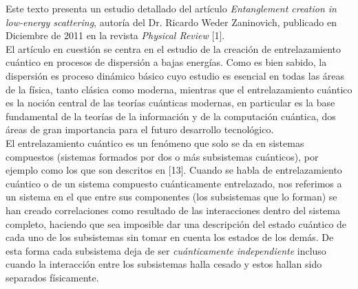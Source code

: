 \documentclass[12pt]{book}
\numberwithin{equation}{chapter}
\begin{document}

$$ $$
\newpage
Este texto presenta un estudio detallado del art\'iculo \emph{Entanglement creation in low-energy scattering}, autor\'ia del Dr. Ricardo Weder Zaninovich, publicado en Diciembre de 2011 en la revista \emph{Physical Review} [1].\\

El art\'iculo en cuesti\'on se centra en el estudio de la creaci\'on de entrelazamiento cu\'antico en procesos de dispersi\'on a bajas energ\'ias. Como es bien sabido, la dispersi\'on  es proceso din\'amico b\'asico cuyo estudio es esencial en todas las \'areas de la f\'isica, tanto cl\'asica como moderna, mientras que el entrelazamiento cu\'antico es la noci\'on central de las teor\'ias cu\'anticas modernas, en particular es la base fundamental de la teor\'ias de la informaci\'on y de la computaci\'on cu\'antica, dos \'areas de gran importancia para el futuro desarrollo tecnol\'ogico. \\

El entrelazamiento cu\'antico es un fen\'omeno que solo se da en sistemas compuestos (sistemas formados por dos o m\'as subsistemas cu\'anticos), por ejemplo como los que son descritos en [13]. Cuando se habla de entrelazamiento cu\'antico o de un sistema compuesto cu\'anticamente entrelazado, nos referimos a un sistema en el que entre sus componentes (los subsistemas que lo forman) se han creado correlaciones como resultado de las interacciones dentro del sistema completo, haciendo que sea imposible dar una descripci\'on del estado cu\'antico de cada uno de los subsistemas sin tomar en cuenta los estados de los dem\'as. De esta forma cada subsistema deja de ser \emph{cu\'anticamente independiente} incluso cuando la interacci\'on entre los subsistemas halla cesado y estos hallan sido separados f\'isicamente.\\
\end{document}
